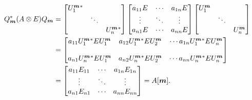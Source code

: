 \documentclass[11pt]{article}
\begin{document}
\begin{small}
  \begin{align}
    \nonumber
    Q_{\bm{m}}^*(A\otimes E)Q_{\bm{m}} &= \begin{bmatrix}
      U^{\bm{m}}_1{}^* && \\
      & \ddots & \\
      && U^{\bm{m}}_n{}^*
    \end{bmatrix} 
    \begin{bmatrix}
      a_{11}E & \cdots  & a_{1n}E\\
      \vdots & \ddots & \vdots \\
      a_{n1}E & \cdots & a_{nn}E
    \end{bmatrix}
    \begin{bmatrix}
      U^{\bm{m}}_1 && \\
      & \ddots & \\
      && U^{\bm{m}}_n
    \end{bmatrix}\\
    \label{eq:5}
    &=
    \begin{bmatrix}
      a_{11}U^{\bm{m}}_1{}^*EU^{\bm{m}}_1 & a_{12}U^{\bm{m}}_1{}^*EU^{\bm{m}}_2 & \cdots a_{1n}U^{\bm{m}}_1{}^*EU^{\bm{m}}_n\\
      \\
      a_{n1}U^{\bm{m}}_n{}^*EU^{\bm{m}}_1 & a_{n2}U^{\bm{m}}_n{}^*EU^{\bm{m}}_2 & \cdots a_{nn}U^{\bm{m}}_n{}^*EU^{\bm{m}}_n
    \end{bmatrix}\\
    &=\begin{bmatrix}
      a_{11}E_{11} & \cdots  & a_{1n}E_{1n}\\
      \vdots & \ddots & \vdots \\
      a_{n1}E_{n1} & \cdots & a_{nn}E_{nn}
    \end{bmatrix}=A[\bm{m}].
  \end{align}
\end{small}
\end{document}
